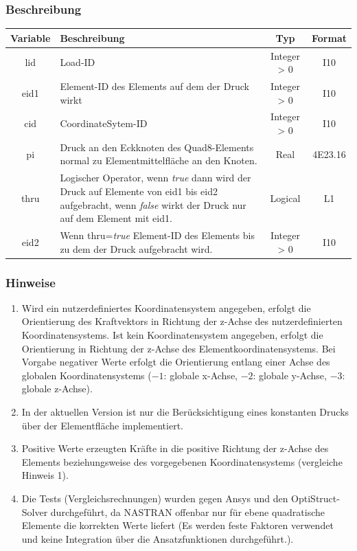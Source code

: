 \documentclass[11pt,titlepage,listof=totoc,bibliography=totoc,twoside]{scrreprt}
\begin{document}
{{\subsubsection{Beschreibung}

\begin{tabularx}{\textwidth}{cXcc}
\toprule
Variable& Beschreibung												& Typ			& Format\\
\midrule
lid	& Load-ID												& Integer > 0	& I10	\\
eid1	& Element-ID des Elements auf dem der Druck wirkt							& Integer > 0	& I10	\\
cid	& CoordinateSytem-ID											& Integer > 0	& I10	\\
pi	& Druck an den Eckknoten des Quad8-Elements normal zu Elementmittelfläche an den Knoten.		& Real			& 4E23.16\\
thru	& Logischer Operator, wenn \emph{true} dann wird der Druck auf Elemente von eid1 bis eid2 aufgebracht, wenn \emph{false} wirkt der Druck nur auf dem Element mit eid1.																		& Logical	& L1	\\
eid2	& Wenn thru=\emph{true} Element-ID des Elements bis zu dem der Druck aufgebracht wird.			& Integer > 0	& I10	\\
\bottomrule
\end{tabularx}

\subsubsection{Hinweise}

\begin{enumerate}
\item Wird ein nutzerdefiniertes Koordinatensystem angegeben, erfolgt die Orientierung des Kraftvektors in Richtung der z-Achse des nutzerdefinierten Koordinatensystems. Ist kein Koordinatensystem angegeben, erfolgt die Orientierung in Richtung der z-Achse des Elementkoordinatensystems. Bei Vorgabe negativer Werte erfolgt die Orientierung entlang einer Achse des globalen Koordinatensystems ($-1$: globale x-Achse, $-2$: globale y-Achse, $-3$: globale z-Achse).
\item In der aktuellen Version ist nur die Berücksichtigung eines konstanten Drucks über der Elementfläche implementiert.
\item Positive Werte erzeugten Kräfte in die positive Richtung der z-Achse des Elements beziehungsweise des vorgegebenen Koordinatensystems (vergleiche Hinweis 1). 
\item Die Tests (Vergleichsrechnungen) wurden gegen Ansys und den OptiStruct-Solver durchgeführt, da NASTRAN offenbar nur für ebene quadratische Elemente die korrekten Werte liefert (Es werden feste Faktoren verwendet und keine Integration über die Ansatzfunktionen durchgeführt.). 
\end{enumerate}

}}
\end{document}
